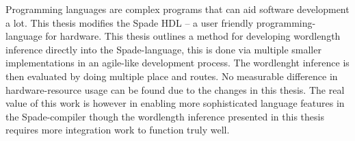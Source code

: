 Programming languages are complex programs that can aid software development a lot. This thesis modifies the Spade HDL -- a user friendly programming-language for hardware. This thesis outlines a method for developing wordlength inference directly into the Spade-language, this is done via multiple smaller implementations in an agile-like development process. The wordlenght inference is then evaluated by doing multiple place and routes. No measurable difference in hardware-resource usage can be found due to the changes in this thesis. The real value of this work is however in enabling more sophisticated language features in the Spade-compiler though the wordlength inference presented in this thesis requires more integration work to function truly well.
